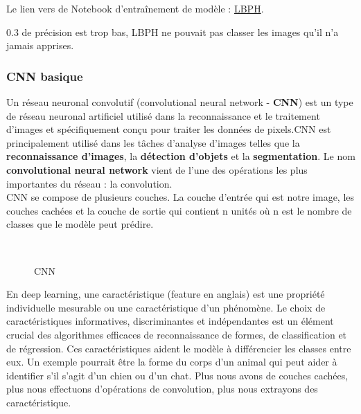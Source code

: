 {Le lien vers de Notebook d'entraînement de modèle : 
\href{https://github.com/mohammedAljadd/iEars/blob/main/Model%20training/Face%20identification/2-LBPH.ipynb}{LBPH}.

0.3 de précision est trop bas, LBPH ne pouvait pas classer les images qu'il n'a jamais apprises.

\subsubsection{CNN basique}
Un réseau neuronal convolutif (convolutional neural network - \textbf{CNN}) est un type de réseau neuronal artificiel utilisé dans la reconnaissance et le traitement d’images et spécifiquement conçu pour traiter les données de pixels.CNN est principalement utilisé dans les tâches d'analyse d'images telles que la \textbf{reconnaissance d'images}, la \textbf{détection d'objets} et la \textbf{segmentation}.
Le nom \textbf{convolutional neural network} vient de l'une des opérations les plus importantes du réseau : la convolution. \\

CNN se compose de plusieurs couches. La couche d'entrée qui est notre image, les couches cachées et la couche de sortie qui contient n unités où n est le nombre de classes que le modèle peut prédire.

\begin{figure}[H] 
\centering
{}\\[0.5cm]
\caption{CNN}
\label{fig:figure6}
\end{figure}

En deep learning, une caractéristique (feature en anglais) est une propriété individuelle mesurable ou une caractéristique d'un phénomène. Le choix de caractéristiques informatives, discriminantes et indépendantes est un élément crucial des algorithmes efficaces de reconnaissance de formes, de classification et de régression. Ces caractéristiques aident le modèle à différencier les classes entre eux. Un exemple pourrait être la forme du corps d'un animal qui peut aider à identifier s'il s'agit d'un chien ou d'un chat. Plus nous avons de couches cachées, plus nous effectuons d'opérations de convolution, plus nous extrayons des caractéristique.

}
